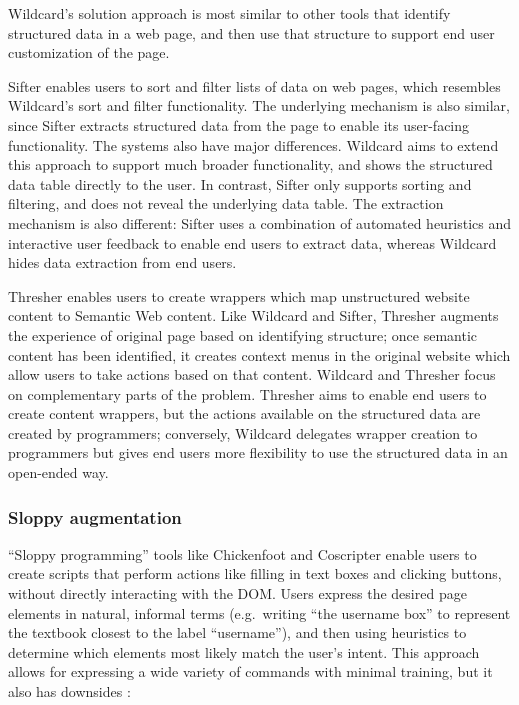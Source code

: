 \documentclass[english,submission]{programming}
\begin{document}
Wildcard's solution approach is most similar to other tools that
identify structured data in a web page, and then use that structure to
support end user customization of the page.

Sifter \autocite{huynh2006} enables users to sort and filter lists of
data on web pages, which resembles Wildcard's sort and filter
functionality. The underlying mechanism is also similar, since Sifter
extracts structured data from the page to enable its user-facing
functionality. The systems also have major differences. Wildcard aims to
extend this approach to support much broader functionality, and shows
the structured data table directly to the user. In contrast, Sifter only
supports sorting and filtering, and does not reveal the underlying data
table. The extraction mechanism is also different: Sifter uses a
combination of automated heuristics and interactive user feedback to
enable end users to extract data, whereas Wildcard hides data extraction
from end users.

Thresher \autocite{hogue2005} enables users to create wrappers which map
unstructured website content to Semantic Web content. Like Wildcard and
Sifter, Thresher augments the experience of original page based on
identifying structure; once semantic content has been identified, it
creates context menus in the original website which allow users to take
actions based on that content. Wildcard and Thresher focus on
complementary parts of the problem. Thresher aims to enable end users to
create content wrappers, but the actions available on the structured
data are created by programmers; conversely, Wildcard delegates wrapper
creation to programmers but gives end users more flexibility to use the
structured data in an open-ended way.

\hypertarget{sloppy-augmentation}{%
\subsubsection{Sloppy augmentation}\label{sloppy-augmentation}}

``Sloppy programming'' \autocite{little2010} tools like Chickenfoot
\autocite{bolin2005} and Coscripter \autocite{leshed2008} enable users
to create scripts that perform actions like filling in text boxes and
clicking buttons, without directly interacting with the DOM. Users
express the desired page elements in natural, informal terms
(e.g.~writing ``the username box'' to represent the textbook closest to
the label ``username''), and then using heuristics to determine which
elements most likely match the user's intent. This approach allows for
expressing a wide variety of commands with minimal training, but it also
has downsides \autocite{little2010}:
\end{document}
